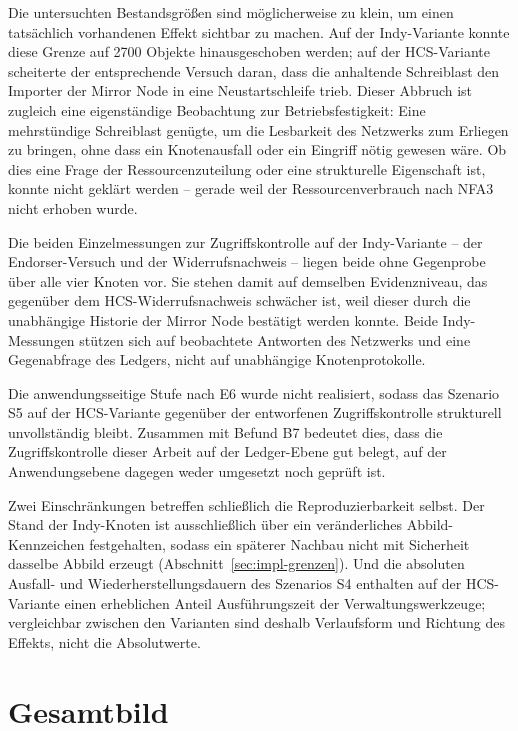 Die untersuchten Bestandsgrößen sind möglicherweise zu klein, um einen tatsächlich vorhandenen Effekt sichtbar zu machen. Auf der Indy-Variante konnte diese Grenze auf 2700 Objekte hinausgeschoben werden; auf der HCS-Variante scheiterte der entsprechende Versuch daran, dass die anhaltende Schreiblast den Importer der Mirror Node in eine Neustartschleife trieb. Dieser Abbruch ist zugleich eine eigenständige Beobachtung zur Betriebsfestigkeit: Eine mehrstündige Schreiblast genügte, um die Lesbarkeit des Netzwerks zum Erliegen zu bringen, ohne dass ein Knotenausfall oder ein Eingriff nötig gewesen wäre. Ob dies eine Frage der Ressourcenzuteilung oder eine strukturelle Eigenschaft ist, konnte nicht geklärt werden -- gerade weil der Ressourcenverbrauch nach NFA3 nicht erhoben wurde.

Die beiden Einzelmessungen zur Zugriffskontrolle auf der Indy-Variante -- der Endorser-Versuch und der Widerrufsnachweis -- liegen beide ohne Gegenprobe über alle vier Knoten vor. Sie stehen damit auf demselben Evidenzniveau, das gegenüber dem HCS-Widerrufsnachweis schwächer ist, weil dieser durch die unabhängige Historie der Mirror Node bestätigt werden konnte. Beide Indy-Messungen stützen sich auf beobachtete Antworten des Netzwerks und eine Gegenabfrage des Ledgers, nicht auf unabhängige Knotenprotokolle.

Die anwendungsseitige Stufe nach E6 wurde nicht realisiert, sodass das Szenario S5 auf der HCS-Variante gegenüber der entworfenen Zugriffskontrolle strukturell unvollständig bleibt. Zusammen mit Befund B7 bedeutet dies, dass die Zugriffskontrolle dieser Arbeit auf der Ledger-Ebene gut belegt, auf der Anwendungsebene dagegen weder umgesetzt noch geprüft ist.

Zwei Einschränkungen betreffen schließlich die Reproduzierbarkeit selbst. Der Stand der Indy-Knoten ist ausschließlich über ein veränderliches Abbild-Kennzeichen festgehalten, sodass ein späterer Nachbau nicht mit Sicherheit dasselbe Abbild erzeugt (Abschnitt~\ref{sec:impl-grenzen}). Und die absoluten Ausfall- und Wiederherstellungsdauern des Szenarios S4 enthalten auf der HCS-Variante einen erheblichen Anteil Ausführungszeit der Verwaltungswerkzeuge; vergleichbar zwischen den Varianten sind deshalb Verlaufsform und Richtung des Effekts, nicht die Absolutwerte.

\section{Gesamtbild}
\label{sec:discussion-gesamtbild}

